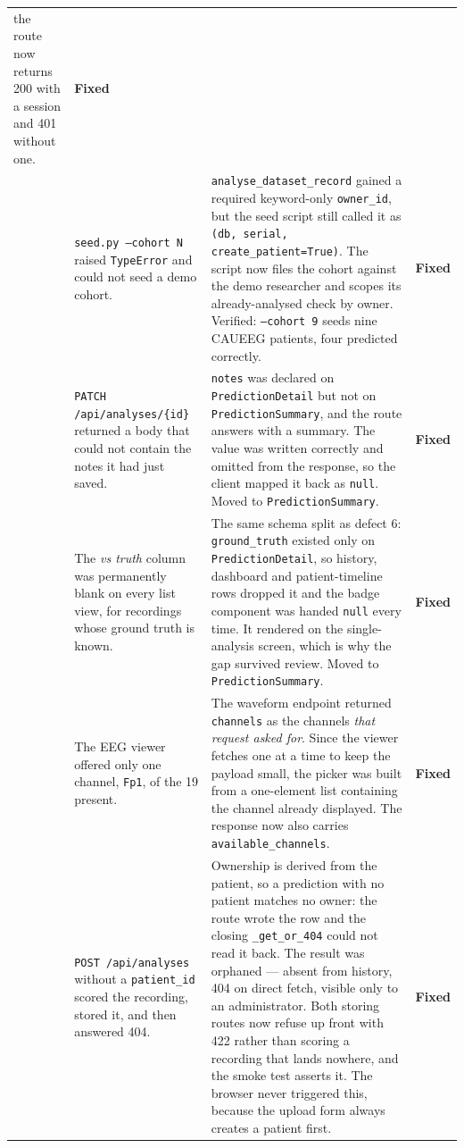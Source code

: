 \documentclass[11pt,a4paper]{article}
\newcommand{\code}[1]{\texttt{#1}}
\newcommand{\stFixed}{\textcolor{okgreen}{\textbf{Fixed}}}
\begin{document}
\begin{table}[H]
\begin{tabularx}{\linewidth}{@{}C{0.5cm} L{3.0cm} Y C{1.1cm}@{}}
the route now returns 200 with a session and 401 without one.
& \stFixed \\
 & \code{seed.py --cohort N} raised \code{TypeError} and could not seed a demo
cohort.
& \code{analyse\_dataset\_record} gained a required keyword-only
\code{owner\_id}, but the seed script still called it as
\code{(db, serial, create\_patient=True)}. The script now files the cohort
against the demo researcher and scopes its already-analysed check by owner.
Verified: \code{--cohort 9} seeds nine CAUEEG patients, four predicted
correctly.
& \stFixed \\
 & \code{PATCH /api/analyses/\{id\}} returned a body that could not contain the
notes it had just saved.
& \code{notes} was declared on \code{PredictionDetail} but not on
\code{PredictionSummary}, and the route answers with a summary. The value was
written correctly and omitted from the response, so the client mapped it back as
\code{null}. Moved to \code{PredictionSummary}.
& \stFixed \\
 & The \emph{vs truth} column was permanently blank on every list view, for
recordings whose ground truth is known.
& The same schema split as defect 6: \code{ground\_truth} existed only on
\code{PredictionDetail}, so history, dashboard and patient-timeline rows dropped
it and the badge component was handed \code{null} every time. It rendered on the
single-analysis screen, which is why the gap survived review. Moved to
\code{PredictionSummary}.
& \stFixed \\
 & The EEG viewer offered only one channel, \code{Fp1}, of the 19 present.
& The waveform endpoint returned \code{channels} as the channels \emph{that
request asked for}. Since the viewer fetches one at a time to keep the payload
small, the picker was built from a one-element list containing the channel
already displayed. The response now also carries \code{available\_channels}.
& \stFixed \\
 & \code{POST /api/analyses} without a \code{patient\_id} scored the recording,
stored it, and then answered 404.
& Ownership is derived from the patient, so a prediction with no patient matches
no owner: the route wrote the row and the closing
\code{\_get\_or\_404} could not read it back. The result was orphaned --- absent
from history, 404 on direct fetch, visible only to an administrator. Both
storing routes now refuse up front with 422 rather than scoring a recording that
lands nowhere, and the smoke test asserts it. The browser never triggered this,
because the upload form always creates a patient first.
& \stFixed \\
\bottomrule
\end{tabularx}
\end{table}
\end{document}
